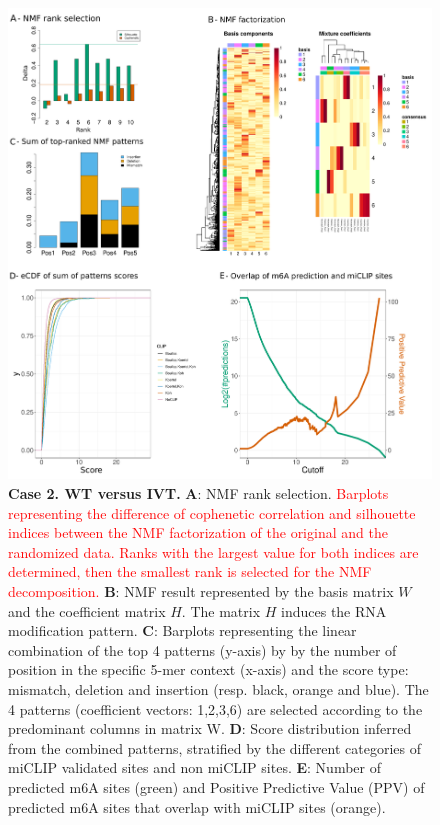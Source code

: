\documentclass[times, 11pt, a4paper]{article}
\begin{document}
\newpage
\begin{figure}[h!]
	\includegraphics[width = 1\textwidth]{img/res_wt_ivt.pdf}
	\caption{\textbf{Case 2. WT  versus IVT.}  \textbf{A}: NMF rank selection. \textcolor{red}{Barplots representing the difference of cophenetic correlation and silhouette indices between the NMF factorization of the original and the randomized data. Ranks with the largest value for both indices are determined, then the smallest rank is selected for the NMF decomposition.} \textbf{B}: NMF result represented by the basis matrix $W$ and the coefficient matrix $H$. The matrix $H$ induces the RNA modification pattern. \textbf{C}: Barplots representing the linear combination of the top 4 patterns (y-axis) by by the number of position in the specific 5-mer context (x-axis) and the score type: mismatch, deletion and insertion (resp. black, orange and blue). The 4 patterns (coefficient vectors: 1,2,3,6) are selected according to the predominant columns in matrix W.  \textbf{D}: Score distribution inferred from the combined patterns, stratified by the different categories of miCLIP validated sites and non miCLIP sites.  \textbf{E}: Number of predicted m6A sites (green) and Positive Predictive Value (PPV) of predicted m6A sites that overlap with miCLIP sites (orange). }
	\label{fig:WT_IVT}
\end{figure}
\newpage
\end{document}
